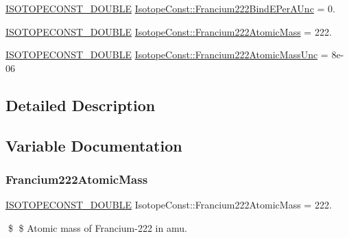 \begin{DoxyCompactItemize}
\mbox{\hyperlink{group___isotope_const-_macros_ga8f45a7272ce02c0b4c65c44636ed719a}{I\+S\+O\+T\+O\+P\+E\+C\+O\+N\+S\+T\+\_\+\+D\+O\+U\+B\+LE}} \mbox{\hyperlink{group___isotope_const-_francium-_fr222_ga5d1b682be770327c2a945e2e4597d1db}{Isotope\+Const\+::\+Francium222\+Bind\+E\+Per\+A\+Unc}} = 0.
\item 
\mbox{\hyperlink{group___isotope_const-_macros_ga8f45a7272ce02c0b4c65c44636ed719a}{I\+S\+O\+T\+O\+P\+E\+C\+O\+N\+S\+T\+\_\+\+D\+O\+U\+B\+LE}} \mbox{\hyperlink{group___isotope_const-_francium-_fr222_ga5d2cd1b0bd8d17296d46becc680b119a}{Isotope\+Const\+::\+Francium222\+Atomic\+Mass}} = 222.
\item 
\mbox{\hyperlink{group___isotope_const-_macros_ga8f45a7272ce02c0b4c65c44636ed719a}{I\+S\+O\+T\+O\+P\+E\+C\+O\+N\+S\+T\+\_\+\+D\+O\+U\+B\+LE}} \mbox{\hyperlink{group___isotope_const-_francium-_fr222_gaf1821aca000f8081cbde2e363818e0f6}{Isotope\+Const\+::\+Francium222\+Atomic\+Mass\+Unc}} = 8e-\/06
\end{DoxyCompactItemize}


\subsection{Detailed Description}


\subsection{Variable Documentation}
\mbox{\label{group___isotope_const-_francium-_fr222_ga5d2cd1b0bd8d17296d46becc680b119a}} 
\subsubsection{\texorpdfstring{Francium222\+Atomic\+Mass}{Francium222AtomicMass}}
{\footnotesize\ttfamily \mbox{\hyperlink{group___isotope_const-_macros_ga8f45a7272ce02c0b4c65c44636ed719a}{I\+S\+O\+T\+O\+P\+E\+C\+O\+N\+S\+T\+\_\+\+D\+O\+U\+B\+LE}} Isotope\+Const\+::\+Francium222\+Atomic\+Mass = 222.}

\$ \$ Atomic mass of Francium-\/222 in amu. \mbox{\label{group___isotope_const-_francium-_fr222_gaf1821aca000f8081cbde2e363818e0f6}} 
